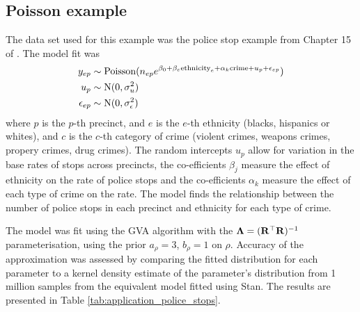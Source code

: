 \documentclass{amsart}[12pt]
\begin{document}
			\subsection{Poisson example}
			The data set used for this example was the police stop example from Chapter 15 of \citep{Gelman2007}.
			The model fit was
			\begin{align*}
				y_{ep}        & \sim \text{Poisson}(n_{ep} e^{\beta_0 + \beta_e \text{ethnicity}_e + \alpha_{k} \text{crime} + u_p + \epsilon_{ep}}) \\
				u_p           & \sim \text{N}(0, \sigma_u^2)                                                                                               \\
				\epsilon_{ep} & \sim \text{N}(0, \sigma_\epsilon^2)                                                                                        
			\end{align*}
			where $p$ is the $p$-th precinct, and $e$ is the $e$-th ethnicity (blacks, hispanics or whites), and $c$ is
			the $c$-th category of crime (violent crimes, weapons crimes, propery crimes, drug crimes). The random 
			intercepts $u_p$ allow for variation in the base rates of stops across precincts,
			the co-efficients $\beta_j$ measure the effect of ethnicity on the rate of police stops and
			the co-efficients $\alpha_k$ measure the effect of each type of crime on the rate.
			The model finds the relationship between the number of police stops in each precinct and 
			ethnicity	for each type of crime.
			
			The model was fit using the GVA algorithm with the ${\boldsymbol \Lambda} = ({\bf R}^\top {\bf R})^{-1}$ parameterisation, using
			the prior $a_\rho = 3$, $b_\rho = 1$ on $\rho$. Accuracy of the approximation was assessed by comparing the
			fitted distribution for each parameter to a kernel density estimate of the parameter's distribution from
			1 million samples from the equivalent model fitted using Stan. The results are presented in Table
			\ref{tab:application_police_stops}.
			
\end{document}
